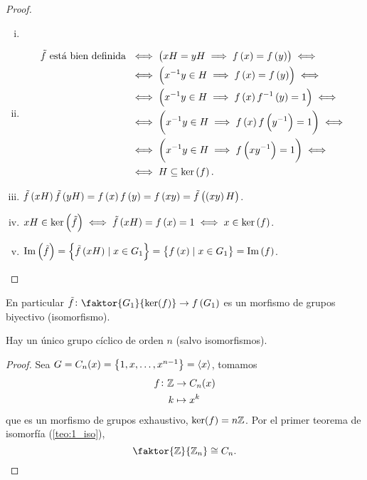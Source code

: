 \begin{proof}
    \begin{enumerate}[i)]
        \item[]
        \item 
            \begin{align*}
                \tilde{f}\text{ está bien definida } &\iff \left( xH=yH\implies f\left( x\right) = f\left( y\right) \right) \iff \\
                &\iff \left( x^{-1}y\in H \implies f\left( x\right) = f\left( y\right) \right) \iff \\
                &\iff \left( x^{-1}y\in H \implies f\left( x\right) f^{-1}\left( y\right) = 1 \right) \iff \\
                &\iff \left( x^{-1}y\in H \implies f\left( x\right) f\left( y^{-1}\right) = 1 \right) \iff \\
                &\iff \left( x^{-1}y\in H \implies f\left( x y^{-1}\right) = 1 \right) \iff \\
                &\iff H\subseteq \ker\left( f\right).
            \end{align*}
        \item $\tilde{f}\left( xH\right)\tilde{f}\left( yH\right)=f\left( x\right) f\left( y\right) = f\left( xy\right) = \tilde{f}\left( \left( xy\right) H\right)$.
        \item $xH\in\ker\left(\tilde{f}\right)\iff\tilde{f}\left( xH\right) = f\left( x\right) = 1\iff x\in\ker\left( f\right)$.
        \item $\operatorname{Im}\left(\tilde{f}\right)=\left\{ \tilde{f}\left( xH\right) \mid x\in G_1\right\} =\left\{ f\left( x\right) \mid x\in G_1\right\} = \operatorname{Im}\left( f\right)$.
    \end{enumerate}

\end{proof}

\begin{col}\label{col:1_teo_iso}
    En particular $\tilde{f} \colon \faktor{G_1}{\ker(f)} \to f\left( G_1 \right)$ es un morfismo de
    grupos biyectivo (isomorfismo).
\end{col}

\begin{col}
    Hay un único grupo cíclico de orden $n$ (salvo isomorfismos).
\end{col}

\begin{proof}
    Sea $G = C_n(x) = \left\{ 1, x, \dots, x^{n-1}\right\} = \langle x \rangle$, tomamos
    \[
        \begin{aligned}
            f \colon \mathbb{Z} &\to C_n(x) \\
            k &\mapsto x^k
        \end{aligned}
    \]
    que es un morfismo de grupos exhaustivo, $\ker(f) = n\mathbb{Z}$. Por el primer teorema de isomorfía (\ref{teo:1_iso}),
    \[
        \faktor{\z}{\z_{n}} \cong C_n.
    \]
\end{proof}


